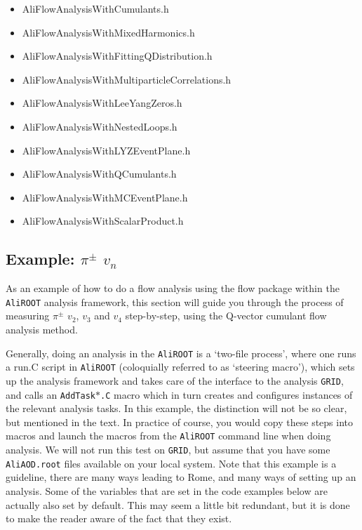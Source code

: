 \documentclass[a4paper]{book}
\numberwithin{equation}{subsection}
\begin{document}
\begin{itemize}
\item AliFlowAnalysisWithCumulants.h             
\item AliFlowAnalysisWithMixedHarmonics.h
\item AliFlowAnalysisWithFittingQDistribution.h \item  AliFlowAnalysisWithMultiparticleCorrelations.h
\item AliFlowAnalysisWithLeeYangZeros.h          
\item AliFlowAnalysisWithNestedLoops.h
\item AliFlowAnalysisWithLYZEventPlane.h         
\item AliFlowAnalysisWithQCumulants.h
\item AliFlowAnalysisWithMCEventPlane.h          
\item AliFlowAnalysisWithScalarProduct.h
\end{itemize}


\subsection{Example: $\pi^{\pm}$ $v_n$}\label{sec:example}
As an example of how to do a flow analysis using the flow package within the \texttt{AliROOT} analysis framework, this section will guide you through the process of measuring $\pi^{\pm}$ $v_2$, $v_3$ and $v_4$ step-by-step, using the Q-vector cumulant flow analysis method. 

Generally, doing an analysis in the \texttt{AliROOT} is a `two-file process', where one runs a run.C script in \texttt{AliROOT} (coloquially referred to as `steering macro'), which sets up the analysis framework and takes care of the interface to the analysis \texttt{GRID}, and calls an \texttt{AddTask$\ast$.C} macro which in turn creates and configures instances of the relevant analysis tasks. In this example, the distinction will not be so clear, but mentioned in the text. In practice of course, you would copy these steps into macros and launch the macros from the \texttt{AliROOT} command line when doing analysis. We will not run this test on \texttt{GRID}, but assume that you have some \texttt{AliAOD.root} files available on your local system. Note that this example is a guideline, there are many ways leading to Rome, and many ways of setting up an analysis. Some of the variables that are set in the code examples below are actually also set by default. This may seem a little bit redundant, but it is done to make the reader aware of the fact that they exist. 
\end{document}
